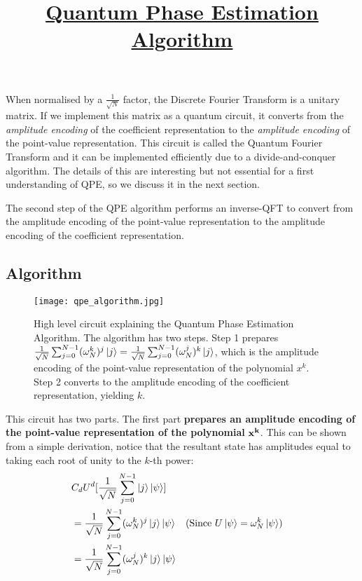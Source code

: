 \documentclass[12pt, a4paper]{article}
\begin{document}
	
	When normalised by a $\frac{1}{\sqrt{N}}$ factor, the Discrete Fourier Transform is a unitary matrix. If we implement this matrix as a quantum circuit, it converts from the \textit{amplitude encoding} of the coefficient representation to the \textit{amplitude encoding} of the point-value representation. This circuit is called the Quantum Fourier Transform and it can be implemented efficiently due to a divide-and-conquer algorithm. The details of this are interesting but not essential for a first understanding of QPE, so we discuss it in the next section.
	
	The second step of the QPE algorithm performs an inverse-QFT to convert from the amplitude encoding of the point-value representation to the amplitude encoding of the coefficient representation.
	
	\subsection{Algorithm}
	
	\begin{figure}
		\centering
		\title{\textbf{\underline{Quantum Phase Estimation Algorithm}}}
		\texttt{[image: qpe\_algorithm.jpg]}
		\caption{High level circuit explaining the Quantum Phase Estimation Algorithm. The algorithm has two steps. Step 1 prepares $\frac{1}{\sqrt{N}}\sum_{j=0}^{N-1}  (\omega^{k}_N)^j \ket{j} = \frac{1}{\sqrt{N}}\sum_{j=0}^{N-1}  (\omega^{j}_N)^k \ket{j}$, which is the amplitude encoding of the point-value representation of the polynomial $x^k$. Step 2 converts to the amplitude encoding of the coefficient representation, yielding $k$.}
		\label{fig:qpealgorithm}
	\end{figure}
	
	
	This circuit has two parts. The first part \textbf{prepares an amplitude encoding of the point-value representation of the polynomial} $\bf{x^k}$. This can be shown from a simple derivation, notice that the resultant state has amplitudes equal to taking each root of unity to the $k$-th power: 
	\begin{align*}
		&C_dU^d [\frac{1}{\sqrt{N}}\sum_{j=0}^{N-1} \ket{j}\ket{\psi}] \\
		&=\frac{1}{\sqrt{N}}\sum_{j=0}^{N-1}  (\omega^{k}_N)^j \ket{j} \ket{\psi}  &&(\text{Since } U\ket{\psi} = \omega_N^k \ket{\psi})\\
		&=\frac{1}{\sqrt{N}}\sum_{j=0}^{N-1}  (\omega^{j}_N)^k \ket{j} \ket{\psi} \\
	\end{align*}
	
\end{document}
